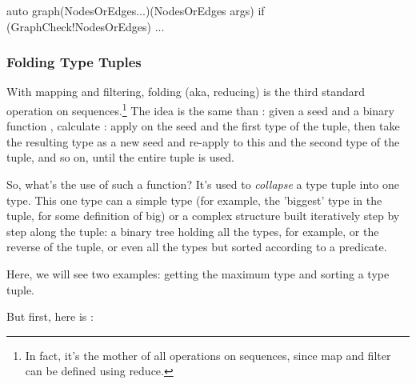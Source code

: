 \begin{dcode}
auto graph(NodesOrEdges...)(NodesOrEdges args) if (GraphCheck!NodesOrEdges)
{ ... }
\end{dcode}


\subsubsection{Folding Type Tuples}\label{staticreduce}

With mapping and filtering, folding (aka, reducing) is the third standard operation on sequences.\footnote{ In fact, it's the mother of all operations on sequences, since map and filter can be defined using reduce.} The idea is the same than : given a seed  and a binary function , calculate : apply  on the seed and the first type of the tuple, then take the resulting type as a new seed and re-apply  to this and the second type of the tuple, and so on, until the entire tuple is used.

So, what's the use of such a function? It's used to \emph{collapse} a type tuple into one type. This one type can a simple type (for example, the 'biggest' type in the tuple, for some definition of big) or a complex structure built iteratively step by step along the tuple: a binary tree holding all the types, for example, or the reverse of the tuple, or even all the types but sorted according to a predicate.

Here, we will see two examples: getting the maximum type and sorting a type tuple.

But first, here is :


